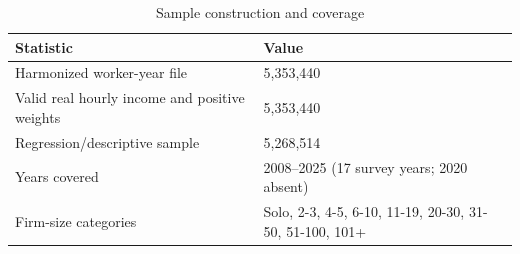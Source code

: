 \begin{table}[htbp]
  \centering
  \caption{Sample construction and coverage}
  \label{tab:sample-construction}
  \small
  \begin{tabular}{lp{}}
    \toprule
    Statistic & Value \\
    \midrule
    Harmonized worker-year file & 5,353,440 \\
    Valid real hourly income and positive weights & 5,353,440 \\
    Regression/descriptive sample & 5,268,514 \\
    Years covered & 2008--2025 (17 survey years; 2020 absent) \\
    Firm-size categories & Solo, 2-3, 4-5, 6-10, 11-19, 20-30, 31-50, 51-100, 101+ \\
    \bottomrule
  \end{tabular}
\end{table}

